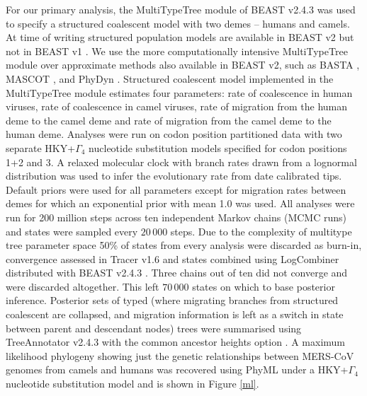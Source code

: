 \documentclass[9pt,lineno]{elife}
\begin{document}
For our primary analysis, the MultiTypeTree module \citep{vaughan_efficient_2014} of BEAST v2.4.3 \citep{bouckaert_beast_2014} was used to specify a structured coalescent model with two demes -- humans and camels.
At time of writing structured population models are available in BEAST v2 \citep{bouckaert_beast_2014} but not in BEAST v1 \citep{drummond_bayesian_2012}.
We use the more computationally intensive MultiTypeTree module \citep{vaughan_efficient_2014} over approximate methods also available in BEAST v2, such as BASTA \citep{maio_new_2015}, MASCOT \citep{mueller_mascot:_2017}, and PhyDyn \citep{volz_complex_2011}.
Structured coalescent model implemented in the MultiTypeTree module \citep{vaughan_efficient_2014} estimates four parameters: rate of coalescence in human viruses, rate of coalescence in camel viruses, rate of migration from the human deme to the camel deme and rate of migration from the camel deme to the human deme.
Analyses were run on codon position partitioned data with two separate HKY+$\Gamma_{4}$ \citep{hky_1985,yang_1994} nucleotide substitution models specified for codon positions 1+2 and 3.
A relaxed molecular clock with branch rates drawn from a lognormal distribution \citep{drummond_2006} was used to infer the evolutionary rate from date calibrated tips.
Default priors were used for all parameters except for migration rates between demes for which an exponential prior with mean 1.0 was used.
All analyses were run for 200 million steps across ten independent Markov chains (MCMC runs) and states were sampled every $20\,000$ steps.
Due to the complexity of multitype tree parameter space 50\% of states from every analysis were discarded as burn-in, convergence assessed in Tracer v1.6 and states combined using LogCombiner distributed with BEAST v2.4.3 \citep{bouckaert_beast_2014}.
Three chains out of ten did not converge and were discarded altogether.
This left $70\,000$ states on which to base posterior inference.
Posterior sets of typed (where migrating branches from structured coalescent are collapsed, and migration information is left as a switch in state between parent and descendant nodes) trees were summarised using TreeAnnotator v2.4.3 with the common ancestor heights option \citep{heled_looking_2013}.
A maximum likelihood phylogeny showing just the genetic relationships between MERS-CoV genomes from camels and humans was recovered using PhyML \citep{guindon_simple_2003} under a HKY+$\Gamma_{4}$ \citep{hky_1985,yang_1994} nucleotide substitution model and is shown in Figure \ref{ml}.
\end{document}
